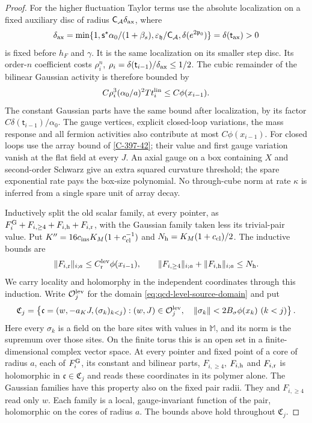 \documentclass[11pt,letterpaper,reqno]{amsart}
\theoremstyle{definition}
\theoremstyle{remark}
\begin{document}
\begin{proof}
For the higher fluctuation Taylor terms use the absolute localization
on a fixed auxiliary disc of radius
$\mathsf C_{\mathcal A}\delta_{\rm ax}$, where
\[
 \delta_{\rm ax}=\min\{1,\mathsf s^\star\alpha_0/(1+\beta_s),
       \varepsilon_{\mathfrak h}/\mathsf C_{\mathcal A},
       \delta(e^{2\mathfrak p_0})\}=\delta(\mathsf t_{\rm ax})>0
\]
is fixed before $h_F$ and $\gamma$. It is the same localization on its smaller step
disc. Its order-$n$ coefficient costs
$\rho_i^n$, $\rho_i=\delta(\mathsf t_{i-1})/\delta_{\rm ax}\le1/2$.
The cubic remainder of the bilinear Gaussian activity is therefore
bounded by
\[
 C\rho_i^3(\alpha_0/a)^2Tt_i^{\rm lin}\le C\phi(x_{i-1}).
\]
The constant Gaussian parts have the same bound after localization,
by its factor $C\delta(\mathsf t_{i-1})/\alpha_0$.
The gauge vertices, explicit closed-loop variations, the mass
response and all fermion activities also contribute at most
$C\phi(x_{i-1})$. For closed loops use the array bound of
\cref{C-397-42}; their value and first gauge variation vanish
at the flat field at every $J$. An axial gauge on a box containing
$X$ and second-order Schwarz give an extra squared curvature
threshold; the spare exponential rate pays the box-size polynomial.
No through-cube norm at rate $\kappa$ is inferred from a single
spare unit of array decay.

Inductively split the old scalar family, at every pointer, as
$F_i^{\rm G}+F_{i,\ge4}+F_{i,\rm h}+F_{i,\rm r}$, with
the Gaussian family taken less its trivial-pair value.
Put $K''=16c_{\rm ins}K_M(1+c_{\rm cl}^{-1})$ and
$N_{\rm h}=K_M(1+c_{\rm cl})/2$. The inductive bounds are
\[
 \|F_{i,\rm r}\|_{i;a}\le C_{\rm r}^{\rm lev}\phi(x_{i-1}),
 \qquad \|F_{i,\ge4}\|_{i;a}+\|F_{i,\rm h}\|_{i;a}
                                                   \le N_{\rm h}.
\]
We carry locality and holomorphy in the independent
coordinates through this induction. Write
$\mathcal O_j^{\rm lev}$ for the domain
\eqref{eq:qcd-level-source-domain} and put
\[
 \mathfrak C_j=
 \left\{\mathfrak c=(w,-a_KJ,(\sigma_k)_{k<j}):
 (w,J)\in\mathcal O_j^{\rm lev},\quad
 \|\sigma_k\|<2B_\sigma\phi(x_k)\ (k<j)\right\}.
\]
Here every $\sigma_k$ is a field on the bare sites with
values in $\mathbb M$, and its norm is the supremum over
those sites. On the finite torus this is an open set
in a finite-dimensional complex vector space. At every
pointer and fixed point of a core of radius $a$, each
of $F_i^{\rm G}$, its constant and bilinear parts,
$F_{i,\ge4}$, $F_{i,\rm h}$ and $F_{i,\rm r}$ is
holomorphic in $\mathfrak c\in\mathfrak C_j$ and reads
these coordinates in its polymer alone. The Gaussian
families have this property also on the fixed pair
radii. They and $F_{i,\ge4}$ read only $w$.
Each family is a local, gauge-invariant function of
the pair, holomorphic on the cores of radius $a$.
The bounds above hold throughout $\mathfrak C_j$.


\end{proof}
\end{document}
